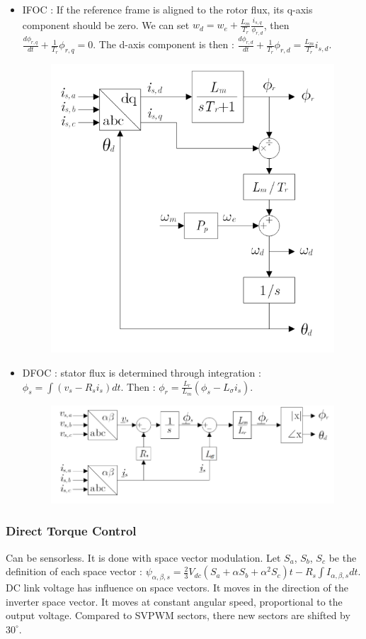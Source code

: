 \documentclass[../main.tex]{subfiles}
\begin{document}
\begin{itemize}
    \item IFOC : If the reference frame is aligned to the rotor flux, its q-axis component should be zero. We can set $w_d = w_e + \frac{L_m}{T_r} \frac{i_{s,q}}{\phi_{r,d}}$, then $\frac{d\phi_{r,q}}{dt} + \frac{1}{T_r} \phi_{r,q} = 0$. The d-axis component is then : $\frac{d\phi_{r,d}}{dt} + \frac{1}{T_r} \phi_{r,d} = \frac{L_m}{T_r} i_{s,d}$. 
    \begin{figure}[hbt!]
        \centering
        \includegraphics[width=0.5\linewidth]{IMAGES/Indus_el/Screenshot from 2025-04-14 16-56-04.png}
    \end{figure}
    \item DFOC : stator flux is determined through integration : $\phi_s = \int(v_s-R_s i_s)dt$. Then : $\phi_r = \frac{L_r}{L_m} (\phi_s - L_\sigma i_s)$.
    \begin{figure}[hbt!]
        \centering
        \includegraphics[width=0.5\linewidth]{IMAGES/Indus_el/Screenshot from 2025-04-14 17-02-59.png}
    
    \end{figure}
\end{itemize}

\subsubsection{Direct Torque Control}
Can be sensorless. It is done with space vector modulation. Let $S_a$, $S_b$, $S_c$ be the definition of each space vector : $\psi_{\alpha,\beta,s} = \frac{2}{3} V_{dc} (S_a + \alpha S_b + \alpha^2 S_c)t-R_s \int I_{\alpha,\beta,s} dt$. \\
\warning DC link voltage has influence on space vectors. It moves in the direction of the inverter space vector. It moves at constant angular speed, proportional to the output voltage. Compared to SVPWM sectors, there new sectors are shifted by $30^\circ$. \\
\end{document}
